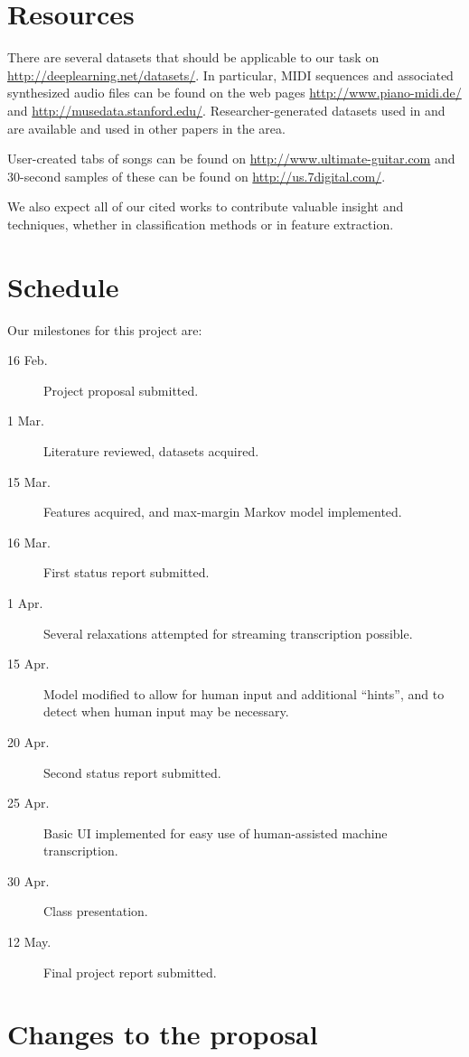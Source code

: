 \documentclass{article}
\begin{document}
\section{Resources}
There are several datasets that should be applicable to our task on
\url{http://deeplearning.net/datasets/}. In particular, MIDI sequences and
associated synthesized audio files can be found on the web pages
\url{http://www.piano-midi.de/} and \url{http://musedata.stanford.edu/}.
Researcher-generated datasets used in \cite{poliner2006discriminative} and
\cite{emiya2010multipitch} are available and used in other papers in the area.

User-created tabs of songs can be found on \url{http://www.ultimate-guitar.com}
and 30-second samples of these can be found on \url{http://us.7digital.com/}.

We also expect all of our cited works to contribute valuable insight and
techniques, whether in classification methods or in feature extraction.


\section{Schedule}
Our milestones for this project are:
\begin{description}
\item[16 Feb.] Project proposal submitted.
\item[ 1 Mar.] Literature reviewed, datasets acquired.
\item[15 Mar.] Features acquired, and max-margin Markov model implemented.
\item[16 Mar.] First status report submitted.
\item[ 1 Apr.] Several relaxations attempted for streaming transcription
  possible.
\item[15 Apr.] Model modified to allow for human input and additional
  ``hints'', and to detect when human input may be necessary.
\item[20 Apr.] Second status report submitted.
\item[25 Apr.] Basic UI implemented for easy use of human-assisted machine
  transcription.
\item[30 Apr.] Class presentation.
\item[12 May.] Final project report submitted.
\end{description}


\section{Changes to the proposal}
\end{document}

